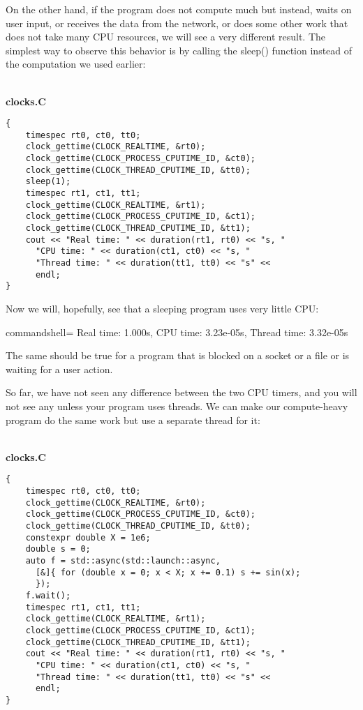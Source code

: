 On the other hand, if the program does not compute much but instead, waits on user input, or receives the data from the network, or does some other work that does not take many CPU resources, we will see a very different result. The simplest way to observe this behavior is by calling the sleep() function instead of the computation we used earlier:

\hspace*{\fill} \\ %
\noindent
\textbf{clocks.C}
\begin{lstlisting}[style=styleCXX]
{
	timespec rt0, ct0, tt0;
	clock_gettime(CLOCK_REALTIME, &rt0);
	clock_gettime(CLOCK_PROCESS_CPUTIME_ID, &ct0);
	clock_gettime(CLOCK_THREAD_CPUTIME_ID, &tt0);
	sleep(1);
	timespec rt1, ct1, tt1;
	clock_gettime(CLOCK_REALTIME, &rt1);
	clock_gettime(CLOCK_PROCESS_CPUTIME_ID, &ct1);
	clock_gettime(CLOCK_THREAD_CPUTIME_ID, &tt1);
	cout << "Real time: " << duration(rt1, rt0) << "s, "
	  "CPU time: " << duration(ct1, ct0) << "s, "
	  "Thread time: " << duration(tt1, tt0) << "s" <<
  	  endl;
}
\end{lstlisting}

Now we will, hopefully, see that a sleeping program uses very little CPU:

\begin{tcblisting}{commandshell={}}
Real time: 1.000s, CPU time: 3.23e-05s, Thread time: 3.32e-05s
\end{tcblisting}

The same should be true for a program that is blocked on a socket or a file or is waiting for a user action.

So far, we have not seen any difference between the two CPU timers, and you will not see any unless your program uses threads. We can make our compute-heavy program do the same work but use a separate thread for it:

\hspace*{\fill} \\ %
\noindent
\textbf{clocks.C}
\begin{lstlisting}[style=styleCXX]
{
	timespec rt0, ct0, tt0;
	clock_gettime(CLOCK_REALTIME, &rt0);
	clock_gettime(CLOCK_PROCESS_CPUTIME_ID, &ct0);
	clock_gettime(CLOCK_THREAD_CPUTIME_ID, &tt0);
	constexpr double X = 1e6;
	double s = 0;
	auto f = std::async(std::launch::async,
	  [&]{ for (double x = 0; x < X; x += 0.1) s += sin(x);
	  });
	f.wait();
	timespec rt1, ct1, tt1;
	clock_gettime(CLOCK_REALTIME, &rt1);
	clock_gettime(CLOCK_PROCESS_CPUTIME_ID, &ct1);
	clock_gettime(CLOCK_THREAD_CPUTIME_ID, &tt1);
	cout << "Real time: " << duration(rt1, rt0) << "s, "
	  "CPU time: " << duration(ct1, ct0) << "s, "
	  "Thread time: " << duration(tt1, tt0) << "s" <<
	  endl;
}
\end{lstlisting}

